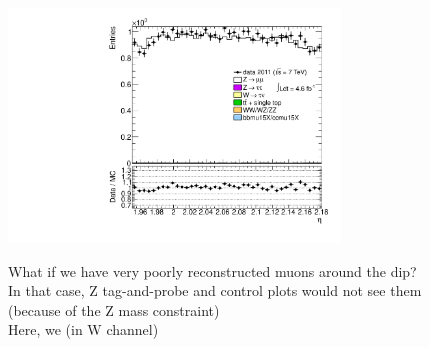 {\includegraphics[width=0.66\textwidth]{dates/20130306/figures/both/Zidms_10_A_stack_lN_eta_ALL.pdf} 
\cole
}

 {
What if we have very poorly reconstructed muons around the dip? \\
In that case, Z tag-and-probe and control plots would not see them \\
(because of the Z mass constraint) \\
Here, we  (in W channel)
}
